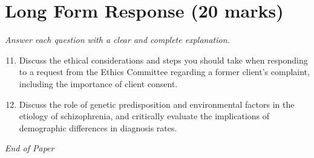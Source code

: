 \documentclass[12pt]{article}
\begin{document}
\section*{Long Form Response (20 marks)}
\textit{Answer each question with a clear and complete explanation.}
\begin{enumerate}[label=\arabic*.]
\setcounter{enumi}{10}
\item Discuss the ethical considerations and steps you should take when responding to a request
from the Ethics Committee regarding a former client’s complaint, including the importance
of client consent.
\item Discuss the role of genetic predisposition and environmental factors in the etiology of
schizophrenia, and critically evaluate the implications of demographic differences in
diagnosis rates.
\end{enumerate}

\vfill
\noindent\textit{End of Paper}
\end{document}
